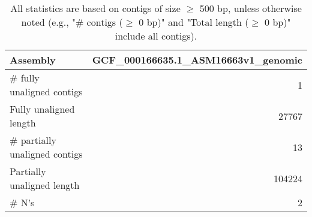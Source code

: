 \documentclass[12pt,a4paper]{article}
\begin{document}
\begin{table}[ht]
\begin{center}
\caption{All statistics are based on contigs of size $\geq$ 500 bp, unless otherwise noted (e.g., "\# contigs ($\geq$ 0 bp)" and "Total length ($\geq$ 0 bp)" include all contigs).}
\begin{tabular}{|l*{1}{|r}|}
\hline
Assembly & GCF\_000166635.1\_ASM16663v1\_genomic \\ \hline
\# fully unaligned contigs & 1 \\ \hline
Fully unaligned length & 27767 \\ \hline
\# partially unaligned contigs & 13 \\ \hline
Partially unaligned length & 104224 \\ \hline
\# N's & 2 \\ \hline
\end{tabular}
\end{center}
\end{table}
\end{document}
